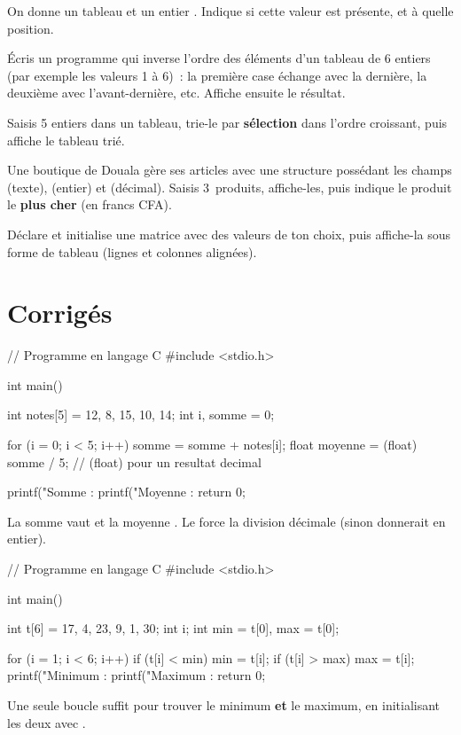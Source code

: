 On donne un tableau  et un entier
. Indique si cette valeur est présente, et à quelle position.


Écris un programme qui inverse l'ordre des éléments d'un tableau  de 6
entiers (par exemple les valeurs 1 à 6)~: la première case échange avec la
dernière, la deuxième avec l'avant-dernière, etc. Affiche ensuite le résultat.

Saisis 5 entiers dans un tableau, trie-le par \textbf{sélection} dans l'ordre
croissant, puis affiche le tableau trié.

Une boutique de Douala gère ses articles avec une structure 
possédant les champs  (texte),  (entier) et 
(décimal). Saisis 3~produits, affiche-les, puis indique le produit le
\textbf{plus cher} (en francs CFA).

Déclare et initialise une matrice  avec des valeurs de ton choix,
puis affiche-la sous forme de tableau (lignes et colonnes alignées).

\section{Corrigés}

\begin{codec}
// Programme en langage C
#include <stdio.h>

int main() {
    int notes[5] = {12, 8, 15, 10, 14};
    int i, somme = 0;

    for (i = 0; i < 5; i++) {
        somme = somme + notes[i];
    }
    float moyenne = (float) somme / 5;    // (float) pour un resultat decimal

    printf("Somme   : %
    printf("Moyenne : %
    return 0;
}
\end{codec}
La somme vaut  et la moyenne . Le  force la
division décimale (sinon  donnerait  en entier).

\begin{codec}
// Programme en langage C
#include <stdio.h>

int main() {
    int t[6] = {17, 4, 23, 9, 1, 30};
    int i;
    int min = t[0], max = t[0];

    for (i = 1; i < 6; i++) {
        if (t[i] < min) min = t[i];
        if (t[i] > max) max = t[i];
    }
    printf("Minimum : %
    printf("Maximum : %
    return 0;
}
\end{codec}
Une seule boucle suffit pour trouver le minimum \textbf{et} le maximum, en
initialisant les deux avec .

